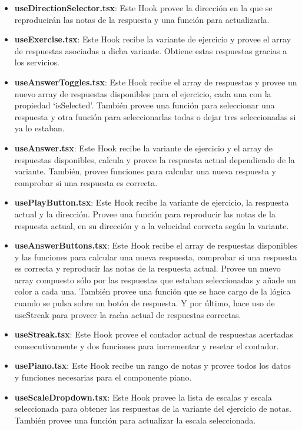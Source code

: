 \documentclass[12pt,twoside,titlepage]{report}
\begin{document}
\begin{itemize}
    \item \textbf{useDirectionSelector.tsx}: Este Hook provee la dirección en la que se reproducirán las notas de la respuesta y una función para actualizarla.
    \item \textbf{useExercise.tsx}: Este Hook recibe la variante de ejercicio y provee el array de respuestas asociadas a dicha variante. Obtiene estas respuestas gracias a los servicios.
    \item \textbf{useAnswerToggles.tsx}: Este Hook recibe el array de respuestas y provee un nuevo array de respuestas disponibles para el ejercicio, cada una con la propiedad ‘isSelected’. También provee una función para seleccionar una respuesta y otra función para seleccionarlas todas o dejar tres seleccionadas si ya lo estaban.
    \item \textbf{useAnswer.tsx}: Este Hook recibe la variante de ejercicio y el array de respuestas disponibles, calcula y provee la respuesta actual dependiendo de la variante. También, provee funciones para calcular una nueva respuesta y comprobar si una respuesta es correcta.
    \item \textbf{usePlayButton.tsx}: Este Hook recibe la variante de ejercicio, la respuesta actual y la dirección. Provee una función para reproducir las notas de la respuesta actual, en su dirección y a la velocidad correcta según la variante.
    \item \textbf{useAnswerButtons.tsx}:  Este Hook recibe el array de respuestas disponibles y las funciones para calcular una nueva respuesta, comprobar si una respuesta es correcta y reproducir las notas de la respuesta actual. Provee un nuevo array compuesto sólo por las respuestas que estaban seleccionadas y añade un color a cada una. También provee una función que se hace cargo de la lógica cuando se pulsa sobre un botón de respuesta. Y por último, hace uso de useStreak para proveer la racha actual de respuestas correctas.
    \item \textbf{useStreak.tsx}: Este Hook provee el contador actual de respuestas acertadas consecutivamente y dos funciones para incrementar y resetar el contador.
    \item \textbf{usePiano.tsx}: Este Hook recibe un rango de notas y provee todos los datos y funciones necesarias para el componente piano.
    \item \textbf{useScaleDropdown.tsx}: Este Hook provee la lista de escalas y escala seleccionada para obtener las respuestas de la variante del ejercicio de notas. También provee una función para actualizar la escala seleccionada.
\end{itemize}
\end{document}
